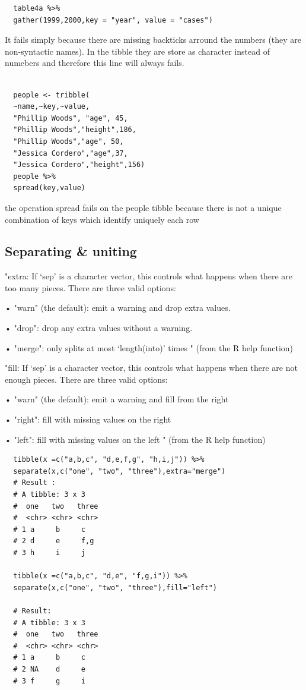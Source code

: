 \documentclass[11pt]{article}
\begin{document}
\begin{verbatim}
  table4a %>%
  gather(1999,2000,key = "year", value = "cases")
\end{verbatim}
It fails simply because there are missing backticks arround the numbers (they are non-syntactic names).
In the tibble they are store as character instead of numebers and therefore this line will always fails.
\begin{verbatim}

  people <- tribble(
  ~name,~key,~value,
  "Phillip Woods", "age", 45,
  "Phillip Woods","height",186,
  "Phillip Woods","age", 50,
  "Jessica Cordero","age",37,
  "Jessica Cordero","height",156)
  people %>%
  spread(key,value)
\end{verbatim}

the operation spread fails on the people tibble because there is not a unique combination
of keys which identify uniquely each row
\subsection{Separating \& uniting}
\label{sec:org016a55b}

"extra: If ‘sep’ is a character vector, this controls what happens
when there are too many pieces. There are three valid
options:

• "warn" (the default): emit a warning and drop extra
values.

• "drop": drop any extra values without a warning.

• "merge": only splits at most ‘length(into)’
times " (from the R help function)

"fill: If ‘sep’ is a character vector, this controls what happens
when there are not enough pieces. There are three valid
options:

• "warn" (the default): emit a warning and fill from the
right

• "right": fill with missing values on the right

• "left": fill with missing values on the left " (from the
R help function)

\begin{verbatim}
  tibble(x =c("a,b,c", "d,e,f,g", "h,i,j")) %>%
  separate(x,c("one", "two", "three"),extra="merge")
  # Result :
  # A tibble: 3 x 3
  #  one   two   three
  #  <chr> <chr> <chr>
  # 1 a     b     c
  # 2 d     e     f,g
  # 3 h     i     j

  tibble(x =c("a,b,c", "d,e", "f,g,i")) %>%
  separate(x,c("one", "two", "three"),fill="left")

  # Result:
  # A tibble: 3 x 3
  #  one   two   three
  #  <chr> <chr> <chr>
  # 1 a     b     c
  # 2 NA    d     e
  # 3 f     g     i
\end{verbatim}
\end{document}
